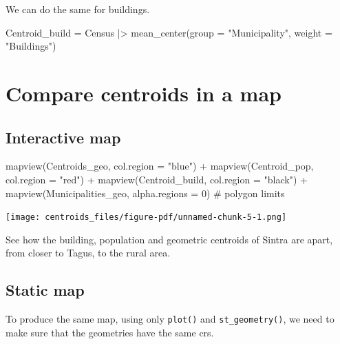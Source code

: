 \documentclass[
  letterpaper,
  DIV=11,
  numbers=noendperiod]{scrreprt}
\newenvironment{Shaded}{\begin{snugshade}}{\end{snugshade}}
\newcommand{\AttributeTok}[1]{\textcolor[rgb]{0.40,0.45,0.13}{#1}}
\newcommand{\CommentTok}[1]{\textcolor[rgb]{0.37,0.37,0.37}{#1}}
\newcommand{\DecValTok}[1]{\textcolor[rgb]{0.68,0.00,0.00}{#1}}
\newcommand{\FunctionTok}[1]{\textcolor[rgb]{0.28,0.35,0.67}{#1}}
\newcommand{\NormalTok}[1]{\textcolor[rgb]{0.00,0.23,0.31}{#1}}
\newcommand{\OtherTok}[1]{\textcolor[rgb]{0.00,0.23,0.31}{#1}}
\newcommand{\SpecialCharTok}[1]{\textcolor[rgb]{0.37,0.37,0.37}{#1}}
\newcommand{\StringTok}[1]{\textcolor[rgb]{0.13,0.47,0.30}{#1}}
\begin{document}
We can do the same for buildings.

\begin{Shaded}
\begin{Highlighting}[]
\NormalTok{Centroid\_build }\OtherTok{=}\NormalTok{ Census }\SpecialCharTok{|\textgreater{}} 
  \FunctionTok{mean\_center}\NormalTok{(}\AttributeTok{group =} \StringTok{"Municipality"}\NormalTok{, }\AttributeTok{weight =} \StringTok{"Buildings"}\NormalTok{)}
\end{Highlighting}
\end{Shaded}

\section{Compare centroids in a map}\label{compare-centroids-in-a-map}

\subsection{Interactive map}\label{interactive-map}

\begin{Shaded}
\begin{Highlighting}[]
\FunctionTok{mapview}\NormalTok{(Centroids\_geo, }\AttributeTok{col.region =} \StringTok{"blue"}\NormalTok{) }\SpecialCharTok{+}
  \FunctionTok{mapview}\NormalTok{(Centroid\_pop, }\AttributeTok{col.region =} \StringTok{"red"}\NormalTok{) }\SpecialCharTok{+}
  \FunctionTok{mapview}\NormalTok{(Centroid\_build, }\AttributeTok{col.region =} \StringTok{"black"}\NormalTok{) }\SpecialCharTok{+}
  \FunctionTok{mapview}\NormalTok{(Municipalities\_geo, }\AttributeTok{alpha.regions =} \DecValTok{0}\NormalTok{) }\CommentTok{\# polygon limits}
\end{Highlighting}
\end{Shaded}

\texttt{[image: centroids\_files/figure-pdf/unnamed-chunk-5-1.png]}

See how the building, population and geometric centroids of Sintra are
apart, from closer to Tagus, to the rural area.

\subsection{Static map}\label{static-map}

To produce the same map, using only \texttt{plot()} and
\texttt{st\_geometry()}, we need to make sure that the geometries have
the same crs.
\end{document}
